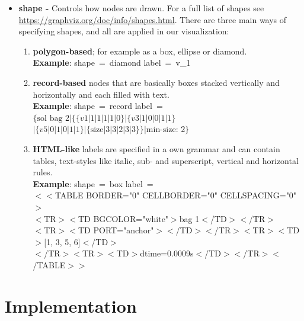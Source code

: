 \documentclass[a4paper, 12pt, bibliography=totoc]{scrartcl}
\begin{document}
\begin{itemize}
	\item \textbf{shape -} Controls how nodes are drawn. For a full list of shapes see \url{https://graphviz.org/doc/info/shapes.html}. There are three main ways of specifying shapes, and all are applied in our visualization: 
	\begin{enumerate}[label=(\arabic*)]
		\item \textbf{polygon-based}; for example as a box, ellipse or diamond.\vspace{10pt}\\		
		\textbf{Example}: shape~=~diamond label~=~v\_1
		
		\item \textbf{record-based} nodes that are basically boxes stacked vertically and horizontally and each filled with text.\vspace{10pt}\\
		\textbf{Example}: shape~=~record label~=~$\{\text{sol bag 2}|\{\{v1|1|1|1|1|0\}|\{v3|1|0|0|1|1\}$ \\
		\hspace*{0pt}\hfill $|\{v5|0|1|0|1|1\}|
		\{\text{size}|3|3|2|3|3\}\}|\text{min-size: 2}\}$
		
		\item \textbf{HTML-like} labels are specified in a own grammar and can contain tables, text-styles like italic, sub- and superscript, vertical and horizontal rules.\vspace{10pt}\\		
		\textbf{Example}: shape~=~box label~=\vspace{5pt}\\
		$<<$TABLE BORDER="0" CELLBORDER="0" CELLSPACING="0"$>$\\
		$<$TR$><$TD BGCOLOR="white"$>$bag 1$<$/TD$><$/TR$>$\\
		$<$TR$><$TD PORT="anchor"$>$$<$/TD$><$/TR$><$TR$><$TD$>$[1, 3, 5, 6]$<$/TD$>$\\ $<$/TR$><$TR$><$TD$>$dtime=0.0009s$<$/TD$><$/TR$><$/TABLE$>>$
	\end{enumerate}
\end{itemize}


\newpage
\section{Implementation}\label{sec:project}
\end{document}
